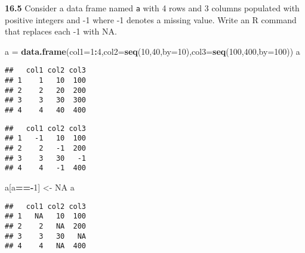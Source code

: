 \documentclass[]{article}
\newenvironment{Shaded}{\begin{snugshade}}{\end{snugshade}}
\newcommand{\KeywordTok}[1]{\textcolor[rgb]{0.13,0.29,0.53}{\textbf{#1}}}
\newcommand{\DataTypeTok}[1]{\textcolor[rgb]{0.13,0.29,0.53}{#1}}
\newcommand{\DecValTok}[1]{\textcolor[rgb]{0.00,0.00,0.81}{#1}}
\newcommand{\StringTok}[1]{\textcolor[rgb]{0.31,0.60,0.02}{#1}}
\newcommand{\OtherTok}[1]{\textcolor[rgb]{0.56,0.35,0.01}{#1}}
\newcommand{\OperatorTok}[1]{\textcolor[rgb]{0.81,0.36,0.00}{\textbf{#1}}}
\newcommand{\NormalTok}[1]{#1}
\begin{document}
\textbf{16.5} Consider a data frame named \texttt{a} with 4 rows and 3
columns populated with positive integers and -1 where -1 denotes a
missing value. Write an R command that replaces each -1 with NA.

\begin{Shaded}
\begin{Highlighting}[]
\NormalTok{a =}\StringTok{ }\KeywordTok{data.frame}\NormalTok{(}\DataTypeTok{col1=}\DecValTok{1}\OperatorTok{:}\DecValTok{4}\NormalTok{,}\DataTypeTok{col2=}\KeywordTok{seq}\NormalTok{(}\DecValTok{10}\NormalTok{,}\DecValTok{40}\NormalTok{,}\DataTypeTok{by=}\DecValTok{10}\NormalTok{),}\DataTypeTok{col3=}\KeywordTok{seq}\NormalTok{(}\DecValTok{100}\NormalTok{,}\DecValTok{400}\NormalTok{,}\DataTypeTok{by=}\DecValTok{100}\NormalTok{))}
\NormalTok{a}
\end{Highlighting}
\end{Shaded}

\begin{verbatim}
##   col1 col2 col3
## 1    1   10  100
## 2    2   20  200
## 3    3   30  300
## 4    4   40  400
\end{verbatim}

\begin{Shaded}
\end{Shaded}

\begin{verbatim}
##   col1 col2 col3
## 1   -1   10  100
## 2    2   -1  200
## 3    3   30   -1
## 4    4   -1  400
\end{verbatim}

\begin{Shaded}
\begin{Highlighting}[]
\NormalTok{a[a}\OperatorTok{==-}\DecValTok{1}\NormalTok{] <-}\StringTok{ }\OtherTok{NA}
\NormalTok{a}
\end{Highlighting}
\end{Shaded}

\begin{verbatim}
##   col1 col2 col3
## 1   NA   10  100
## 2    2   NA  200
## 3    3   30   NA
## 4    4   NA  400
\end{verbatim}
\end{document}
